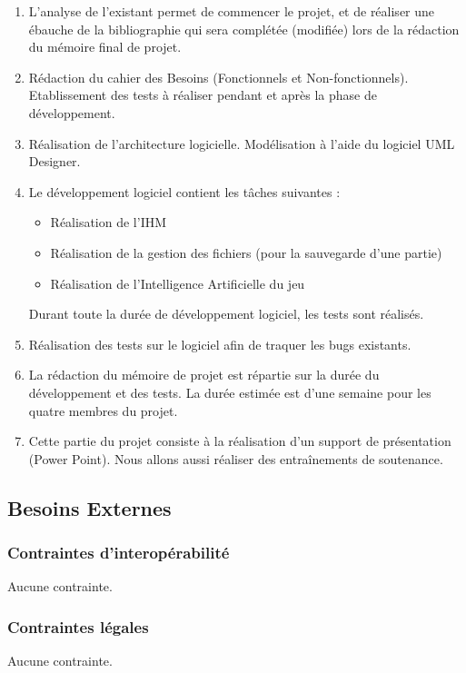 \documentclass[a4paper,12pt]{article}
\begin{document}
\begin{enumerate}
\item L'analyse de l'existant permet de commencer le projet, et de réaliser une ébauche de la bibliographie qui sera complétée (modifiée) lors de la rédaction du mémoire final de projet.
\item Rédaction du cahier des Besoins (Fonctionnels et Non-fonctionnels). Etablissement des tests à réaliser pendant et après la phase de développement.
\item Réalisation de l'architecture logicielle. Modélisation à l'aide du logiciel UML Designer.
\item Le développement logiciel contient les tâches suivantes :
  \begin{itemize}
  \item Réalisation de l'IHM 
  \item Réalisation de la gestion des fichiers (pour la sauvegarde d'une partie)
  \item Réalisation de l'Intelligence Artificielle du jeu
  \end{itemize}
  Durant toute la durée de développement logiciel, les tests sont réalisés.
\item Réalisation des tests sur le logiciel afin de traquer les bugs existants.
\item La rédaction du mémoire de projet est répartie sur la durée du développement et des tests. La durée estimée est d'une semaine pour les quatre membres du projet.
\item  Cette partie du projet consiste à la réalisation d'un support de présentation (Power Point). Nous allons aussi réaliser des entraînements de soutenance.
\end{enumerate}

\subsection{Besoins Externes}

\subsubsection{Contraintes d'interopérabilité}

Aucune contrainte.

\subsubsection{Contraintes légales}

Aucune contrainte.
\end{document}
